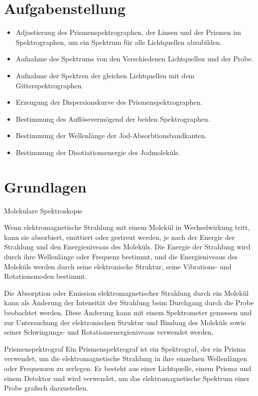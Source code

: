\documentclass[12pt,english,ngerman]{scrartcl}
\begin{document}
\section{Aufgabenstellung\label{Auf}}

\begin{itemize}
	\item Adjustierung des Prismenspektrographen, der Linsen und der Prismen im Spektrographen, um ein Spektrum für alle 
	Lichtquellen abzubilden.
	\item Aufnahme des Spektrums von den Verschiedenen Lichtquellen und der Probe.
	\item Aufnahme der Spektren der gleichen Lichtquellen mit dem Gitterspektrographen.
	\item Erzeugung der Dispersionskurve des Prismenspektrographen.
	\item Bestimmung des Auflösevermögend der beiden Spektrographen.
	\item Bestimmung der Wellenlänge der Jod-Absorbtionsbandkanten.
	\item Bestimmung der Disotiationsenergie des Jodmoleküls.
\end{itemize}

\section{Grundlagen}\label{Grund}


Molekulare Spektroskopie

Wenn elektromagnetische Strahlung mit einem Molekül in Wechselwirkung tritt, kann sie absorbiert, emittiert oder gestreut werden, je nach der Energie der Strahlung und den Energieniveaus des Moleküls. Die Energie der Strahlung wird durch ihre Wellenlänge oder Frequenz bestimmt, und die Energieniveaus des Moleküls werden durch seine elektronische Struktur, seine Vibrations- und Rotationsmoden bestimmt.

Die Absorption oder Emission elektromagnetischer Strahlung durch ein Molekül kann als Änderung der Intensität der Strahlung beim Durchgang durch die Probe beobachtet werden. Diese Änderung kann mit einem Spektrometer gemessen und zur Untersuchung der elektronischen Struktur und Bindung des Moleküls sowie seiner Schwingungs- und Rotationsenergieniveaus verwendet werden.

Prismenspektrograf
Ein Prismenspektrograf ist ein Spektrograf, der ein Prisma verwendet, um die elektromagnetische Strahlung in ihre einzelnen Wellenlängen oder Frequenzen zu zerlegen. Er besteht aus einer Lichtquelle, einem Prisma und einem Detektor und wird verwendet, um das elektromagnetische Spektrum einer Probe grafisch darzustellen.
\end{document}
